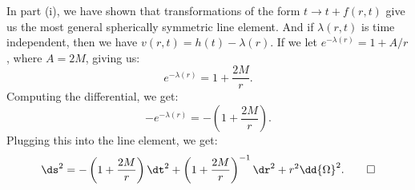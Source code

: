 \begin{solution}[(iii)]
  In part (i), we have shown that transformations of the form $t \to t + f(r, t)$ give us the most general spherically symmetric line element. And if $\lambda(r, t)$ is time independent, then we have $v(r, t) = h(t) - \lambda(r)$. If we let $e^{-\lambda(r)} = 1 + A/r$, where $A = 2M$, giving us:
  \[%
    e^{-\lambda(r)} = 1 + \frac{2M}{r}
  .\]%
  Computing the differential, we get:
  \[%
    -e^{-\lambda(r)} = -\left(1 + \frac{2M}{r}\right)
  .\]%
  Plugging this into the line element, we get:
  \[%
    \ds^2 = -\left(1 + \frac{2M}{r}\right)\dt^2 + \left(1 + \frac{2M}{r}\right)^{-1}\dr^2 + r^2\dd{\Omega}^2
  .\qedhere\]%
\end{solution}
